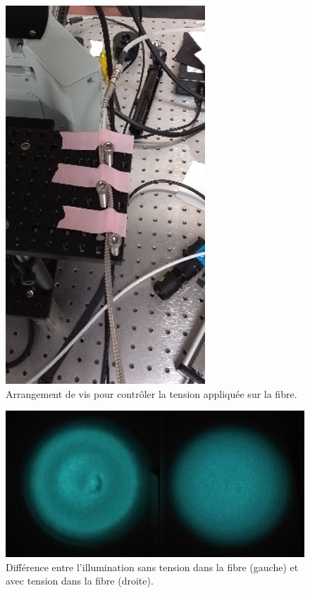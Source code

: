 \documentclass{article}       %
\begin{document}
\begin{figure}[H]
    \centering
    \includegraphics[scale=0.75]{fig/Vis.png}
    \caption{Arrangement de vis pour contrôler la tension appliquée sur la fibre.}
    \label{Fig:Vis}
\end{figure}

\begin{figure}[H]
    \centering
    \includegraphics[scale=0.75]{fig/Illumination.png}
    \caption{Différence entre l'illumination sans tension dans la fibre (gauche) et avec tension dans la fibre (droite).}
    \label{Fig:Illumination}
\end{figure}
\end{document}
